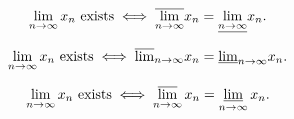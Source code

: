 $$\lim_{n\to\infty}x_n {\rm\ exists} \iff
\overline{\lim_{n\to\infty}}x_n = \underline{\lim_{n\to\infty}}x_n.$$


$$\lim_{n\to\infty}x_n {\rm\ exists} \iff
\overline{\lim}_{n\to\infty}x_n = \underline{\lim}_{n\to\infty}x_n.$$

$$\lim_{n\to\infty}x_n {\rm\ exists} \iff
\mathop{\overline{\lim}}\limits_{n\to\infty}x_n = \mathop{\underline{\lim}}\limits_{n\to\infty}x_n.$$

\bye

